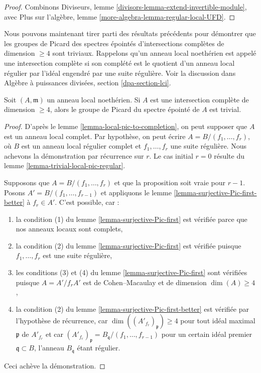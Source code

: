 \begin{proof}
Combinons Diviseurs, lemme \ref{divisors-lemma-extend-invertible-module},
avec Plus sur l'algèbre, lemme \ref{more-algebra-lemma-regular-local-UFD}.
\end{proof}

\noindent
Nous pouvons maintenant tirer parti des résultats précédents pour démontrer que
les groupes de Picard des spectres épointés
d'intersections complètes de dimension $\geq 4$ sont triviaux.
Rappelons qu'un anneau local noethérien est appelé une intersection
complète si son complété est le quotient d'un
anneau local régulier par l'idéal engendré par une suite régulière.
Voir la discussion dans Algèbre à puissances divisées, section \ref{dpa-section-lci}.

\begin{proposition}[Grothendieck]
\label{proposition-trivial-local-pic-complete-intersection}
Soit $(A, \mathfrak m)$ un anneau local noethérien. Si $A$ est une
intersection complète de dimension $\geq 4$, alors le groupe de Picard
du spectre épointé de $A$ est trivial.
\end{proposition}

\begin{proof}
D'après le lemme \ref{lemma-local-pic-to-completion}, on peut supposer que $A$ est
un anneau local complet. Par hypothèse, on peut écrire
$A = B/(f_1, \ldots, f_r)$, où $B$ est un anneau local régulier
complet et $f_1, \ldots, f_r$ une suite régulière.
Nous achevons la démonstration par récurrence sur $r$.
Le cas initial $r = 0$ résulte du
lemme \ref{lemma-trivial-local-pic-regular}.

\medskip\noindent
Supposons que $A = B/(f_1, \ldots, f_r)$ et que la proposition
soit vraie pour $r - 1$. Posons $A' = B/(f_1, \ldots, f_{r - 1})$ et appliquons le
lemme \ref{lemma-surjective-Pic-first-better} à $f_r \in A'$.
C'est possible, car :
\begin{enumerate}
\item la condition (1) du lemme \ref{lemma-surjective-Pic-first} est vérifiée
parce que nos anneaux locaux sont complets,
\item la condition (2) du lemme \ref{lemma-surjective-Pic-first} est vérifiée
puisque $f_1, \ldots, f_r$ est une suite régulière,
\item les conditions (3) et (4) du lemme \ref{lemma-surjective-Pic-first} sont vérifiées
puisque $A = A'/f_r A'$ est de Cohen--Macaulay et de dimension $\dim(A) \geq 4$,
\item la condition (2) du lemme \ref{lemma-surjective-Pic-first-better}
est vérifiée par l'hypothèse de récurrence, car
$\dim((A'_{f_r})_\mathfrak p) \geq 4$ pour tout idéal maximal
$\mathfrak p$ de $A'_{f_r}$ et car
$(A'_{f_r})_\mathfrak p = B_\mathfrak q/(f_1, \ldots, f_{r - 1})$
pour un certain idéal premier $\mathfrak q \subset B$, l'anneau $B_\mathfrak q$ étant régulier.
\end{enumerate}
Ceci achève la démonstration.
\end{proof}

